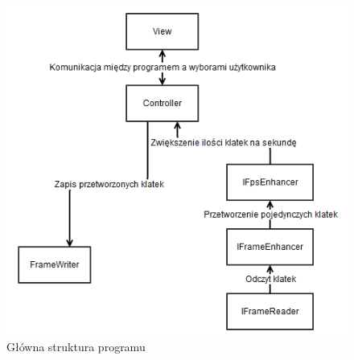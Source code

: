 \documentclass[twoside]{projektInzynierskiMS}
\begin{document}
\begin{figure}[h]
\centering
\includegraphics[width=12cm]{UML.png}
\caption{Główna struktura programu}
\end{figure}
\end{document}
